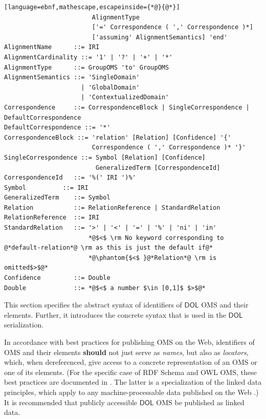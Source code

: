 \documentclass[10pt, a4paper]{isov2}
\makeatletter
\newcommand*\CommentAuthor{}
\renewcommand*\CommentAuthor{#1}}
\newcommand*\CommentDate{}
\renewcommand*\CommentDate{#1}}
\newcommand*\CommentId{}
\renewcommand*\CommentId{#1}}
\newcommand*\CommentType{}
\renewcommand*\CommentType{#1}}
\newcommand*{\SetCommentColorByType}[1]{%
\edef\localType{{#1}}%
\expandafter\ifstrequal\localType{q-aut}{\colorlet{CommentColor}{red}}{%
\expandafter\ifstrequal\localType{q-all}{\colorlet{CommentColor}{orange}}{%
\expandafter\ifstrequal\localType{todo}{\colorlet{CommentColor}{orange}}{%
\expandafter\ifstrequal\localType{fyi}{\colorlet{CommentColor}{lightgray}}{%
\colorlet{CommentColor}{yellow}}}}}}
\newcommand*{\SetCommentPrefixByType}[1]{%
\edef\localType{{#1}}%
\expandafter\@ifmtarg\localType{%
\edef\CommentPrefix{}%
}{%
\caseupper[q]{#1}%
\edef\CommentPrefix{\thestring: }%
}}
\newcommand*{\initComment}[1]{%
\setkeys{Comment}{#1}%
\SetCommentColorByType{\CommentType}%
\relax%
\SetCommentPrefixByType{\CommentType}%
\relax%
}
\newcommand*{\todonote}[2][]{%
\initComment{#1}%
\pdfcomment[author=\CommentAuthor,color=CommentColor,date=\CommentDate,id=\CommentId]{%
\CommentPrefix
#2}}
\renewcommand*{\todonote}[2][]{%
\initComment{#1}%
\ednote{\CommentPrefix #2}}
\newcommand*{\CLnote}[2][author=Christoph Lange]{%
\todonote[author=Christoph Lange,#1]{#2}}
\newcommand*{\should}{\textbf{should}\xspace}
\newcommand*{\DOL}{\ensuremath{\mathsf{DOL}}\xspace}
\makeatother
\begin{document}
\begin{lstlisting}[language=ebnf,mathescape,escapeinside={*@}{@*}]
                        AlignmentType
                        ['=' Correspondence ( ',' Correspondence )*]
                        ['assuming' AlignmentSemantics] 'end'
AlignmentName      ::= IRI
AlignmentCardinality ::= '1' | '?' | '+' | '*'
AlignmentType      ::= GroupOMS 'to' GroupOMS
AlignmentSemantics ::= 'SingleDomain'
                     | 'GlobalDomain'
                     | 'ContextualizedDomain'
Correspondence     ::= CorrespondenceBlock | SingleCorrespondence | DefaultCorrespondence
DefaultCorrespondence ::= '*' 
CorrespondenceBlock ::= 'relation' [Relation] [Confidence] '{'
                        Correspondence ( ',' Correspondence )* '}'
SingleCorrespondence ::= Symbol [Relation] [Confidence]
                         GeneralizedTerm [CorrespondenceId]
CorrespondenceId   ::= '%(' IRI ')%'
Symbol          ::= IRI
GeneralizedTerm    ::= Symbol
Relation           ::= RelationReference | StandardRelation
RelationReference  ::= IRI
StandardRelation   ::= '>' | '<' | '=' | '%' | 'ni' | 'in'
                       *@$<$ \rm No keyword corresponding to @*default-relation*@ \rm as this is just the default if@*
                       *@\phantom{$<$ }@*Relation*@ \rm is omitted$>$@*
Confidence         ::= Double
Double             ::= *@$<$ a number $\in [0,1]$ $>$@*
\end{lstlisting}




\label{c:identifiers}
This section specifies the abstract syntax of identifiers of \DOL OMS and their elements. Further, 
it introduces the concrete syntax that is used in the \DOL serialization. 
\label{c:iris}


In accordance with best practices for publishing OMS on the Web, identifiers of OMS and their 
elements \should not just serve as \emph{names}, but also as \emph{locators}, which, when 
dereferenced, give access to a concrete representation of an OMS or one of its elements.  (For the 
specific case of RDF Schema and OWL OMS, these best practices are documented in 
\cite{W3C:NOTE-swbp-vocab-pub-20080828}.  The latter is a specialization of the linked data 
principles, which apply to any machine-processable data published on the Web 
\cite{BernersLee:LinkedData2006}.)  It is recommended that publicly accessible \DOL OMS be published 
as linked data.
\end{document}

